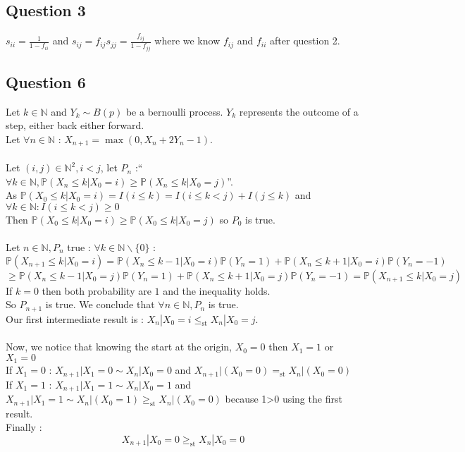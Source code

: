 \documentclass{article}
\begin{document}
\subsection*{Question 3}
$s_{ii} = \frac{1}{1-f_{ii}}$ and $s_{ij} = f_{ij}s_{jj} = \frac{f_{ij}}{1-f_{jj}}$ where we know $f_{ij}$ and $f_{ii}$ after question 2.
\subsection*{Question 6}
Let $k\in\mathbb{N}$ and $Y_k\sim B(p)$ be a bernoulli process. $Y_k$ represents the outcome of a step, either back either forward.
\\
Let $\forall n \in \mathbb{N} $ : $X_{n+1} = \max(0, X_n+2Y_n-1)$.
\\\\
Let $(i,j)\in\mathbb{N}^2, i<j$, let $P_n$ :``$\forall k \in \mathbb{N},\mathbb{P}(X_{n} \leq k|X_0=i)\ge\mathbb{P}(X_n \leq k |X_0 = j)$''.
\\
As $\mathbb{P}(X_0\leq k|X_0 = i) = I(i \leq k) = I(i\leq k < j)+I(j\leq k) $ and $\forall k \in \mathbb{N} : I(i\leq k<j)\ge0$
\\
Then $\mathbb{P}(X_0\leq k | X_0=i)\ge \mathbb{P}(X_0\leq k|X_0=j)$ so $P_0$ is true.
\\\\
Let $n\in \mathbb{N}, P_n$ true : $\forall k \in \mathbb{N} \backslash\{0\}$ :
\\
$\mathbb{P}(X_{n+1}\leq k|X_0=i) = \mathbb{P}(X_n\leq k-1|X_0 = i)\mathbb{P}(Y_n = 1)+\mathbb{P}(X_n\leq k+1|X_0=i)\mathbb{P}(Y_n=-1)$
\\
$\ge \mathbb{P}(X_n\leq k-1|X_0 = j)\mathbb{P}(Y_n = 1)+\mathbb{P}(X_n\leq k+1|X_0=j)\mathbb{P}(Y_n=-1) = \mathbb{P}(X_{n+1}\leq k|X_0=j) $
\\
If $k = 0$ then both probability are $1$ and the inequality holds.
\\
So $P_{n+1}$ is true. We conclude that $\forall n \in \mathbb{N}, P_n$ is true.
\\
Our first intermediate result is : $X_n|X_0=i\leq_{\text{st}}X_n|X_0=j$.
\\\\
Now, we notice that knowing the start at the origin, $X_0=0$ then $X_1 = 1$ or $X_1=0$
\\
If $X_1 = 0$ : $X_{n+1}|X_1=0 \sim X_n|X_0 = 0$ and $X_{n+1}|(X_0 = 0) =_{\text{st}} X_n|(X_0=0) $
\\
If $X_1 = 1$ : $X_{n+1}|X_1 = 1 \sim X_n|X_0=1$ and $X_{n+1}|X_1 = 1\sim X_{n}|(X_0 = 1) \ge_{\text{st}} X_n|(X_0=0) $ because 1>0 using the first result.
\\
Finally :$$\boxed{X_{n+1}|X_0=0\ge_{\text{st}}X_n|X_0=0}$$
\end{document}
